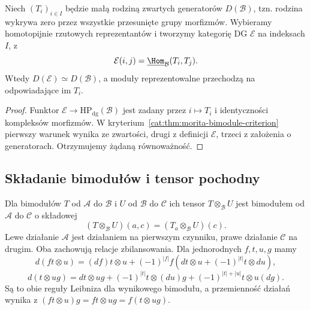 \begin{wniosek}\label{cat:cor:morita-many-generators}
Niech $(T_i)_{i\in I}$ będzie małą rodziną zwartych generatorów $D(\mathcal B)$, tzn. rodzina wykrywa zero przez wszystkie przesunięte grupy morfizmów. Wybieramy homotopijnie rzutowych reprezentantów i tworzymy kategorię DG $\mathcal E$ na indeksach $I$, z
\[
 \mathcal E(i,j)=\underline{\Hom}_{\mathcal B}(T_i,T_j).
\]
Wtedy $D(\mathcal E)\simeq D(\mathcal B)$, a moduły reprezentowalne przechodzą na odpowiadające im $T_i$.
\end{wniosek}
\begin{proof}
Funktor $\mathcal E\to\mathrm{HP}_{\mathrm{dg}}(\mathcal B)$ jest zadany przez $i\mapsto T_i$ i identyczności kompleksów morfizmów. W kryterium~\ref{cat:thm:morita-bimodule-criterion} pierwszy warunek wynika ze zwartości, drugi z definicji $\mathcal E$, trzeci z założenia o generatorach. Otrzymujemy żądaną równoważność.
\end{proof}

\subsection{Składanie bimodułów i tensor pochodny}

\begin{definicja}\label{cat:def:morita-bimodule-composition}
Dla bimodułów $T$ od $\mathcal A$ do $\mathcal B$ i $U$ od $\mathcal B$ do $\mathcal C$ ich tensor $T\otimes_{\mathcal B}U$ jest bimodułem od $\mathcal A$ do $\mathcal C$ o składowej
\[
 (T\otimes_{\mathcal B}U)(a,c)=
 (T_a\otimes_{\mathcal B}U)(c).
\]
Lewe działanie $\mathcal A$ jest działaniem na pierwszym czynniku, prawe działanie $\mathcal C$ na drugim. Oba zachowują relacje zbilansowania. Dla jednorodnych $f,t,u,g$ mamy
\[
 d(ft\otimes u)=(df)t\otimes u+(-1)^{|f|}f(dt\otimes u+(-1)^{|t|}t\otimes du),
\]
\[
 d(t\otimes ug)=dt\otimes ug+(-1)^{|t|}t\otimes(du)g
                  +(-1)^{|t|+|u|}t\otimes u(dg).
\]
Są to obie reguły Leibniza dla wynikowego bimodułu, a przemienność działań wynika z $(ft\otimes u)g=ft\otimes ug=f(t\otimes ug)$.
\end{definicja}

